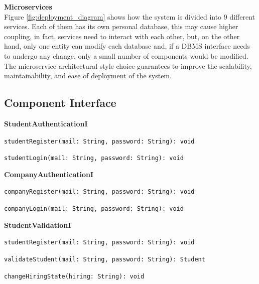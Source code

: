 \documentclass[12pt]{article}
\numberwithin{figure}{section}
\numberwithin{table}{section}
\begin{document}
    \hspace{-0.8cm}
    \textbf{Microservices} \\
    Figure \ref{fig:deployment_diagram} shows how the system is divided into 9 different services.
    Each of them has its own personal database, this may cause higher coupling, in fact, services need to interact with each other, but, on the other hand, only one entity can modify each database and, if a DBMS interface needs to undergo any change, only a small number of components would be modified. \\
    The microservice architectural style choice guarantees to improve the scalability, maintainability, and ease of deployment of the system.

\subsection{Component Interface}
    \textbf{StudentAuthenticationI}
    \begin{itemize}
        \begin{footnotesize}
            \item \verb|studentRegister(mail: String, password: String): void|
            \item \verb|studentLogin(mail: String, password: String): void|
        \end{footnotesize}
    \end{itemize}

    \textbf{CompanyAuthenticationI}
    \begin{itemize}
        \begin{footnotesize}
            \item \verb|companyRegister(mail: String, password: String): void|
            \item \verb|companyLogin(mail: String, password: String): void|
        \end{footnotesize}
    \end{itemize}

    \textbf{StudentValidationI}
    \begin{itemize}
        \begin{footnotesize}
            \item \verb|studentRegister(mail: String, password: String): void|
            \item \verb|validateStudent(mail: String, password: String): Student|
            \item \verb|changeHiringState(hiring: String): void|
        \end{footnotesize}
    \end{itemize}
\end{document}
